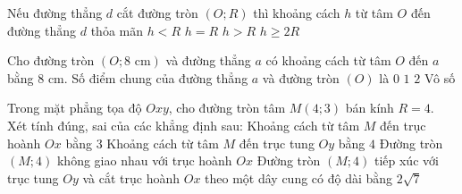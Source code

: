 

\begin{ex}%
	Nếu đường thẳng $d$ cắt đường tròn $(O; R)$ thì khoảng cách $h$ từ tâm $O$ đến đường thẳng $d$ thỏa mãn
	\choice
	{\True $h < R$}
	{$h = R$}
	{$h > R$}
	{$h \ge 2R$}
\end{ex}

\begin{ex}%
	Cho đường tròn $(O; 8\text{ cm})$ và đường thẳng $a$ có khoảng cách từ tâm $O$ đến $a$ bằng $8\text{ cm}$. Số điểm chung của đường thẳng $a$ và đường tròn $(O)$ là
	\choice
	{$0$}
	{\True $1$}
	{$2$}
	{Vô số}
\end{ex}

\begin{ex}%
	Trong mặt phẳng tọa độ $Oxy$, cho đường tròn tâm $M(4; 3)$ bán kính $R = 4$. Xét tính đúng, sai của các khẳng định sau:
	\choiceTF
	{\True Khoảng cách từ tâm $M$ đến trục hoành $Ox$ bằng $3$}
	{\True Khoảng cách từ tâm $M$ đến trục tung $Oy$ bằng $4$}
	{Đường tròn $(M; 4)$ không giao nhau với trục hoành $Ox$}
	{\True Đường tròn $(M; 4)$ tiếp xúc với trục tung $Oy$ và cắt trục hoành $Ox$ theo một dây cung có độ dài bằng $2\sqrt{7}$}
\end{ex}

